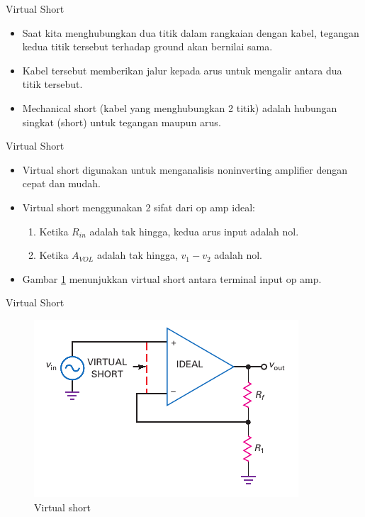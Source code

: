 \begin{frame}{Virtual Short}
	\begin{itemize}
		\item Saat kita menghubungkan dua titik dalam rangkaian dengan kabel, tegangan kedua titik tersebut terhadap ground akan bernilai sama.
		\item Kabel tersebut memberikan jalur kepada arus untuk mengalir antara dua titik tersebut.
		\item Mechanical short (kabel yang menghubungkan 2 titik) adalah hubungan singkat (short) untuk tegangan maupun arus.
	\end{itemize}
\end{frame}

\begin{frame}{Virtual Short}
	\begin{itemize}
		\item Virtual short digunakan untuk menganalisis noninverting amplifier dengan cepat dan mudah.
		\item Virtual short menggunakan 2 sifat dari op amp ideal:
		
		\begin{enumerate}
			\item Ketika $ R_{in} $ adalah tak hingga, kedua arus input adalah nol.
			\item Ketika $ A_{VOL} $ adalah tak hingga, $ v_1 - v_2 $ adalah nol.
		\end{enumerate}
		
		\item Gambar \ref{fig-16.19} menunjukkan virtual short antara terminal input op amp.
		
	\end{itemize}
\end{frame}

\begin{frame}{Virtual Short}
	\begin{figure}
		\centering
		\includegraphics[height=0.7\textheight]{gambar/fig-16.19}
		\caption{Virtual short}
		\label{fig-16.19}
	\end{figure}
\end{frame}

